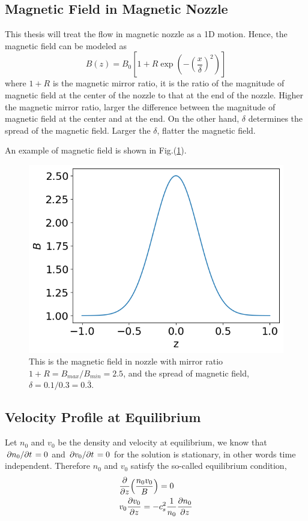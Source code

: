 \subsection{Magnetic Field in Magnetic Nozzle} \label{sec:magnetic-field-in-nozzle}
This thesis will treat the flow in magnetic nozzle as a 1D motion. Hence, the magnetic field can be modeled as 
\[ B(z) = B_0 \left[1 + R\exp(-\left(\frac{x}{\delta}\right)^2)\right] \]
where $1+R$ is the magnetic mirror ratio, it is the ratio of the magnitude of magnetic field at the center of the nozzle to that at the end of the nozzle. Higher the magnetic mirror ratio, larger the difference between the magnitude of magnetic field at the center and at the end. On the other hand, $\delta$ determines the spread of the magnetic field. Larger the $\delta$, flatter the magnetic field. 

An example of magnetic field is shown in Fig.(\ref{fig:magnetic-field}).
\begin{figure}[H]
	\centering 
	\includegraphics[width=0.7\linewidth]{img/governing-equations/magnetic-field}
	\caption{This is the magnetic field in nozzle with mirror ratio $1+R=B_{max}/B_{min}=2.5$, and the spread of magnetic field, $\delta=0.1/0.3=0.\bar{3}$. }
	\label{fig:magnetic-field}
\end{figure}


\subsection{Velocity Profile at Equilibrium}
Let $n_0$ and $v_0$ be the density and velocity at equilibrium, we know that $\pdv*{n_0}{t}=0$ and $\pdv*{v_0}{t}=0$ for the solution is stationary, in other words time independent. Therefore $n_0$ and $v_0$ satisfy the so-called equilibrium condition,
\begin{align*}
	&\pdv{z}(\frac{n_0v_0}{B}) = 0 \\
	&v_0\pdv{v_0}{z} = -c_s^2\frac{1}{n_0}\pdv{n_0}{z} 
\end{align*}

